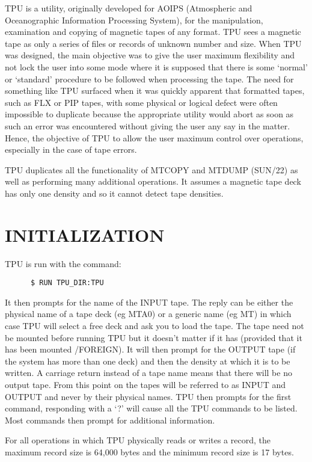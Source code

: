 TPU is a utility, originally developed for AOIPS (Atmospheric and Oceanographic
Information Processing System), for the manipulation, examination and copying of
magnetic tapes of any format.
TPU sees a magnetic tape as only a series of files or records of unknown number
and size.
When TPU was designed, the main objective was to give the user maximum
flexibility and not lock the user into some mode where it is supposed that there
is some `normal' or `standard' procedure to be followed when processing the
tape.
The need for something like TPU surfaced when it was quickly apparent that
formatted tapes, such as FLX or PIP tapes, with some physical or logical defect
were often impossible to duplicate because the appropriate utility would abort
as soon as such an error was encountered without giving the user any say in the
matter.
Hence, the objective of TPU to allow the user maximum control over operations,
especially in the case of tape errors.

TPU duplicates all the functionality of MTCOPY and MTDUMP (SUN/22) as well as
performing many additional operations.
It assumes a magnetic tape deck has only one density and so it cannot detect
tape densities.

\section{INITIALIZATION}

TPU is run with the command:

\begin{verbatim}
      $ RUN TPU_DIR:TPU
\end{verbatim}

It then prompts for the name of the INPUT tape.
The reply can be either the physical name of a tape deck (eg MTA0) or a generic
name (eg MT) in which case TPU will select a free deck and ask you to load the
tape.
The tape need not be mounted before running TPU but it doesn't matter if it has
(provided that it has been mounted /FOREIGN).
It will then prompt for the OUTPUT tape (if the system has more than one deck)
and then the density at which it is to be written.
A carriage return instead of a tape name means that there will be no output
tape.
From this point on the tapes will be referred to as INPUT and OUTPUT and never 
by their physical names.
TPU then prompts for the first command, responding with a `?' will cause all the
TPU commands to be listed.
Most commands then prompt for additional information.

For all operations in which TPU physically reads or writes a record, the
maximum record size is 64,000 bytes and the minimum record size is 17 bytes.

